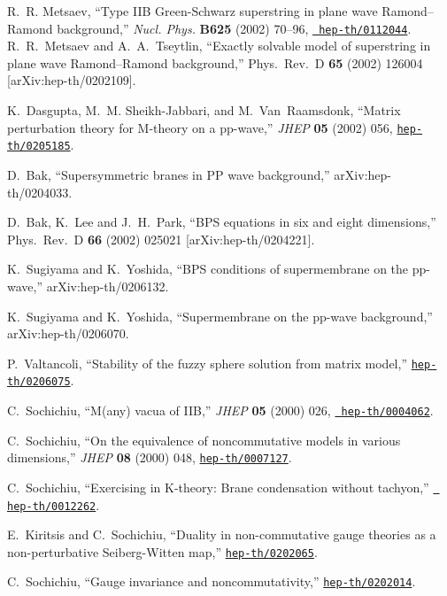 \documentclass[a4paper]{article}
\begin{document}
\begin{thebibliography}{10}
R.~R. Metsaev, ``Type IIB Green-Schwarz superstring in plane wave
Ramond--Ramond background,'' {\em Nucl. Phys.} {\bf B625} (2002)
70--96, \href{http://arXiv.org/abs/hep-th/0112044}{{\tt
hep-th/0112044}}.
R.~R.~Metsaev and A.~A.~Tseytlin, ``Exactly solvable model of
superstring in plane wave Ramond--Ramond  background,'' Phys.\
Rev.\ D {\bf 65} (2002) 126004 [arXiv:hep-th/0202109].


K.~Dasgupta, M.~M. Sheikh-Jabbari, and M.~Van~Raamsdonk, ``Matrix perturbation
  theory for M-theory on a pp-wave,'' {\em JHEP} {\bf 05} (2002) 056,
\href{http://arXiv.org/abs/hep-th/0205185}{{\tt hep-th/0205185}}.

D.~Bak, ``Supersymmetric branes in PP wave background,''
arXiv:hep-th/0204033.

D.~Bak, K.~Lee and J.~H.~Park, ``BPS equations in six and eight
dimensions,'' Phys.\ Rev.\ D {\bf 66} (2002) 025021
[arXiv:hep-th/0204221].

K.~Sugiyama and K.~Yoshida,
``BPS conditions of supermembrane on the pp-wave,''
arXiv:hep-th/0206132.

K.~Sugiyama and K.~Yoshida,
``Supermembrane on the pp-wave background,''
arXiv:hep-th/0206070.

P.~Valtancoli, ``Stability of the fuzzy sphere solution from matrix model,''
\href{http://arXiv.org/abs/hep-th/0206075}{{\tt hep-th/0206075}}.

C.~Sochichiu, ``M(any) vacua of IIB,'' {\em JHEP} {\bf 05} (2000)
026, \href{http://arXiv.org/abs/hep-th/0004062}{{\tt
hep-th/0004062}}.

C.~Sochichiu, ``On the equivalence of noncommutative models in various
  dimensions,'' {\em JHEP} {\bf 08} (2000) 048,
\href{http://arXiv.org/abs/hep-th/0007127}{{\tt hep-th/0007127}}.

C.~Sochichiu, ``Exercising in K-theory: Brane condensation without
tachyon,'' \href{http://arXiv.org/abs/hep-th/0012262}{{\tt
hep-th/0012262}}.

E.~Kiritsis and C.~Sochichiu, ``Duality in non-commutative gauge theories as a
  non-perturbative Seiberg-Witten map,''
\href{http://arXiv.org/abs/hep-th/0202065}{{\tt hep-th/0202065}}.

C.~Sochichiu, ``Gauge invariance and noncommutativity,''
\href{http://arXiv.org/abs/hep-th/0202014}{{\tt hep-th/0202014}}.

\end{thebibliography}\endgroup
\end{document}
